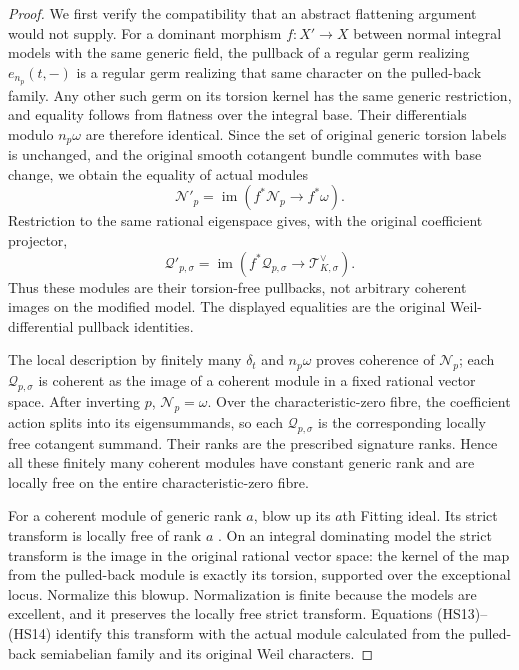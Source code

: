\begin{proof}
We first verify the compatibility that an abstract flattening
argument would not supply. For a dominant morphism $f:X'\to X$
between normal integral models with the same generic field,
the pullback of a regular germ realizing $e_{n_p}(t,-)$ is a
regular germ realizing that same character on the pulled-back
family. Any other such germ on its torsion kernel has the same
generic restriction, and equality follows from flatness over
the integral base. Their differentials modulo $n_p\omega$ are
therefore identical. Since the set of original generic torsion
labels is unchanged, and the original smooth cotangent bundle
commutes with base change, we obtain the equality of actual
modules
\[
 \mathcal N'_p
   =\operatorname{im}(f^*\mathcal N_p\longrightarrow f^*\omega).
 \tag{HS13}
\]
Restriction to the same rational eigenspace gives, with the
original coefficient projector,
\[
 \mathcal Q'_{p,\sigma}
   =\operatorname{im}(f^*\mathcal Q_{p,\sigma}
                      \longrightarrow\mathcal T_{K,\sigma}^{\vee}).
 \tag{HS14}
\]
Thus these modules are their torsion-free pullbacks, not arbitrary
coherent images on the modified model. The displayed equalities
are the original Weil-differential pullback identities.

The local description by finitely many $\delta_t$ and
$n_p\omega$ proves coherence of $\mathcal N_p$; each
$\mathcal Q_{p,\sigma}$ is coherent as the image of a coherent
module in a fixed rational vector space. After inverting $p$,
$\mathcal N_p=\omega$. Over the characteristic-zero fibre, the
coefficient action splits into its eigensummands, so each
$\mathcal Q_{p,\sigma}$ is the corresponding locally free
cotangent summand. Their ranks are the prescribed signature
ranks. Hence all these finitely many coherent modules have
constant generic rank and are locally free on the entire
characteristic-zero fibre.

For a coherent module of generic rank $a$, blow up its $a$th
Fitting ideal. Its strict transform is locally free of rank $a$
\cite[Lemma~31.36.3]{hodge-flattening}. On an integral dominating
model the strict transform is the image in the original rational
vector space: the kernel of the map from the pulled-back module
is exactly its torsion, supported over the exceptional locus.
Normalize this blowup. Normalization is finite because the models
are excellent, and it preserves the locally free strict transform.
Equations \textup{(HS13)--(HS14)} identify this transform with
the actual module calculated from the pulled-back semiabelian
family and its original Weil characters.


\end{proof}
